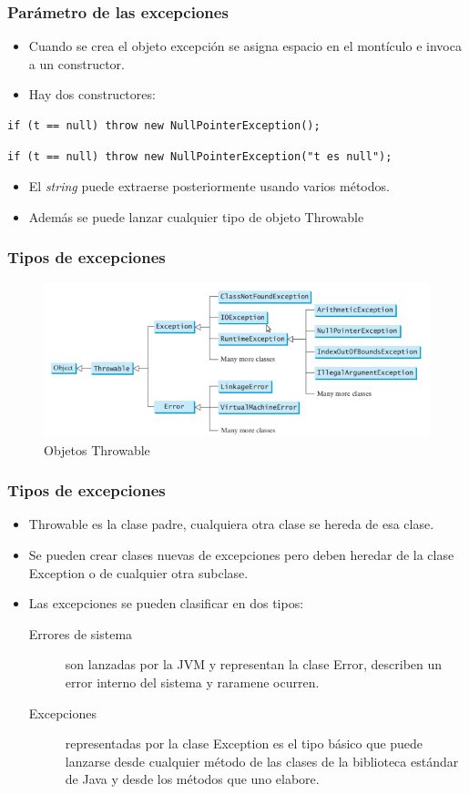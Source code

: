 \documentclass{beamer}
\begin{document}
\begin{frame}[fragile]
\frametitle{Parámetro de las excepciones}
\begin{itemize}[<+->]
\item Cuando se crea el objeto excepción se asigna espacio en el montículo e invoca a un constructor.
\item Hay dos constructores:
\end{itemize}
\pause
\begin{verbatim}
if (t == null) throw new NullPointerException();
\end{verbatim}
\pause
\begin{verbatim}
if (t == null) throw new NullPointerException("t es null");
\end{verbatim}
\begin{itemize}[<+->]
\item El \emph{string} puede extraerse posteriormente usando varios métodos.
\item Además se puede lanzar cualquier tipo de objeto \alert{Throwable}
\end{itemize}
\end{frame}


\begin{frame}
\frametitle{Tipos de excepciones}
\begin{figure}
\includegraphics[scale=0.6]{imagenes/excepciones.png} 
\caption{Objetos Throwable}
\end{figure} 
\end{frame}

\begin{frame}
\frametitle{Tipos de excepciones}
\begin{itemize}[<+->]
\item \alert{Throwable} es la clase padre, cualquiera otra clase se hereda de esa clase.
\item Se pueden crear clases nuevas de excepciones pero deben heredar de la clase \alert{Exception} o de cualquier otra subclase.
\item Las excepciones se pueden clasificar en dos tipos:
\begin{description}
\item[Errores de sistema] son lanzadas por la JVM y representan la clase \alert{Error}, describen un error interno del sistema y raramene ocurren.
\item[Excepciones] representadas por la clase \alert{Exception} es el tipo básico que puede lanzarse desde cualquier método de las clases de la biblioteca estándar de Java y desde los métodos que uno elabore.
\end{description}
\end{itemize}
\end{frame}
\end{document}
